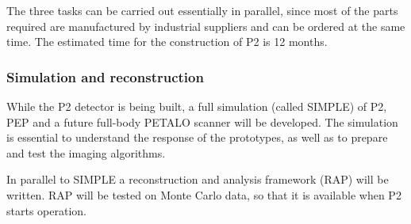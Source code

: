 The three tasks can be carried out essentially in parallel, since most of the parts required are manufactured by industrial suppliers and can be ordered at the same time. The estimated time for the construction of P2 is 12 months. 


 


\subsubsection*{Simulation and reconstruction}
While the P2 detector is being built, a full simulation (called SIMPLE) of P2, PEP and a future full-body PETALO scanner will be developed. The simulation is essential to understand the response of the prototypes, as well as to prepare and test the imaging algorithms.

In parallel to SIMPLE a reconstruction and analysis framework (RAP) will be written. RAP will be tested on Monte Carlo data, so that it is available when P2 starts operation. 

